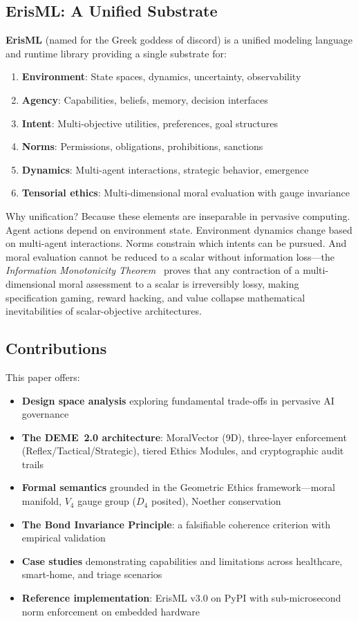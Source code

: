 \documentclass[conference]{IEEEtran}
\begin{document}
\subsection{ErisML: A Unified Substrate}

\textbf{ErisML} (named for the Greek goddess of discord) is a
unified modeling language and runtime library providing a single substrate for:

\begin{enumerate}
\item \textbf{Environment}: State spaces, dynamics, uncertainty, observability
\item \textbf{Agency}: Capabilities, beliefs, memory, decision interfaces
\item \textbf{Intent}: Multi-objective utilities, preferences, goal structures
\item \textbf{Norms}: Permissions, obligations, prohibitions, sanctions
\item \textbf{Dynamics}: Multi-agent interactions, strategic behavior, emergence
\item \textbf{Tensorial ethics}: Multi-dimensional moral evaluation with gauge invariance
\end{enumerate}

Why unification? Because these elements are inseparable in pervasive
computing. Agent actions depend on environment state. Environment
dynamics change based on multi-agent interactions. Norms constrain which
intents can be pursued. And moral evaluation cannot be reduced to a scalar without information loss---the \emph{Information Monotonicity Theorem}~\cite{bond2026ge} proves that any contraction of a multi-dimensional moral assessment to a scalar is irreversibly lossy, making specification gaming, reward hacking, and value collapse mathematical inevitabilities of scalar-objective architectures.

\subsection{Contributions}

This paper offers:
\begin{itemize}
\item \textbf{Design space analysis} exploring fundamental trade-offs in pervasive AI governance
\item \textbf{The DEME~2.0 architecture}: MoralVector (9D), three-layer enforcement (Reflex/Tactical/Strategic), tiered Ethics Modules, and cryptographic audit trails
\item \textbf{Formal semantics} grounded in the Geometric Ethics framework---moral manifold, $V_4$ gauge group ($D_4$ posited), Noether conservation
\item \textbf{The Bond Invariance Principle}: a falsifiable coherence criterion with empirical validation
\item \textbf{Case studies} demonstrating capabilities and limitations across healthcare, smart-home, and triage scenarios
\item \textbf{Reference implementation}: ErisML v3.0 on PyPI with sub-microsecond norm enforcement on embedded hardware
\end{itemize}
\end{document}
